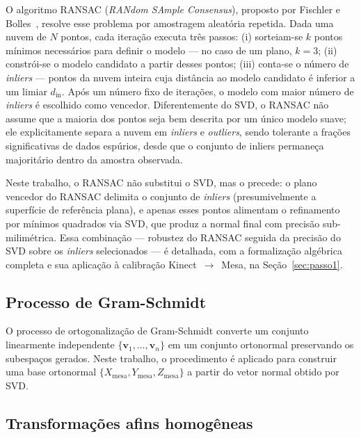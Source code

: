 O algoritmo RANSAC (\textit{RANdom SAmple Consensus}), proposto
por Fischler e Bolles~, resolve esse problema por
amostragem aleatória repetida. Dada uma nuvem de $N$ pontos, cada
iteração executa três passos: (i) sorteiam-se $k$ pontos mínimos
necessários para definir o modelo — no caso de um plano, $k = 3$; (ii)
constrói-se o modelo candidato a partir desses pontos; (iii) conta-se o
número de \textit{inliers} — pontos da nuvem inteira cuja distância ao
modelo candidato é inferior a um limiar $d_{\text{in}}$. Após um número
fixo de iterações, o modelo com maior número de \textit{inliers} é escolhido como
vencedor. Diferentemente do SVD, o RANSAC não assume que a maioria dos
pontos seja bem descrita por um único modelo suave; ele explicitamente
separa a nuvem em \textit{inliers} e \textit{outliers}, sendo tolerante a frações
significativas de dados espúrios, desde que o conjunto de inliers
permaneça majoritário dentro da amostra observada.

Neste trabalho, o RANSAC não substitui o SVD, mas o precede: o
plano vencedor do RANSAC delimita o conjunto de \textit{inliers} (presumivelmente
a superfície de referência plana), e apenas esses pontos alimentam o
refinamento por mínimos quadrados via SVD, que produz a normal final com
precisão sub-milimétrica. Essa combinação — robustez do RANSAC seguida
da precisão do SVD sobre os \textit{inliers} selecionados — é detalhada, com a
formalização algébrica completa e sua aplicação à calibração
Kinect~$\to$~Mesa, na Seção~\ref{sec:passo1}.

\subsection{Processo de Gram-Schmidt}
\label{subsec:gs}

O processo de ortogonalização de Gram-Schmidt converte um conjunto
linearmente independente $\{\mathbf{v}_1, \ldots, \mathbf{v}_n\}$ em um
conjunto ortonormal preservando os subespaços gerados. Neste trabalho,
o procedimento é aplicado para construir uma base ortonormal
$\{X_{\text{mesa}}, Y_{\text{mesa}}, Z_{\text{mesa}}\}$ a partir do
vetor normal obtido por SVD.

\subsection{Transformações afins homogêneas}
\label{subsec:afim}

